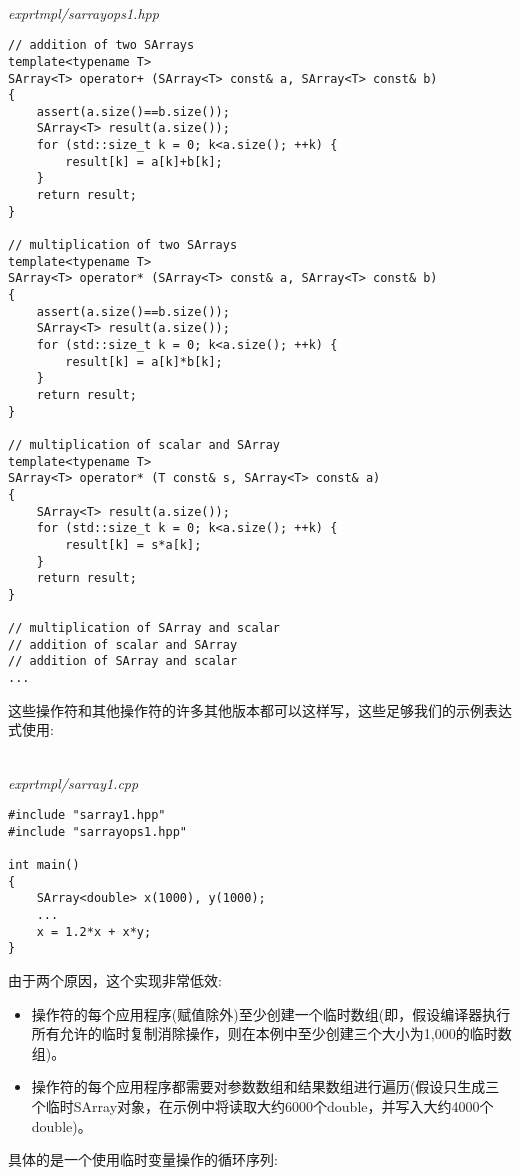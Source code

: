 \hspace*{\fill} \\ %
\noindent
\textit{exprtmpl/sarrayops1.hpp}
\begin{lstlisting}[style=styleCXX]
// addition of two SArrays
template<typename T>
SArray<T> operator+ (SArray<T> const& a, SArray<T> const& b)
{
	assert(a.size()==b.size());
	SArray<T> result(a.size());
	for (std::size_t k = 0; k<a.size(); ++k) {
		result[k] = a[k]+b[k];
	}
	return result;
}

// multiplication of two SArrays
template<typename T>
SArray<T> operator* (SArray<T> const& a, SArray<T> const& b)
{
	assert(a.size()==b.size());
	SArray<T> result(a.size());
	for (std::size_t k = 0; k<a.size(); ++k) {
		result[k] = a[k]*b[k];
	}
	return result;
}

// multiplication of scalar and SArray
template<typename T>
SArray<T> operator* (T const& s, SArray<T> const& a)
{
	SArray<T> result(a.size());
	for (std::size_t k = 0; k<a.size(); ++k) {
		result[k] = s*a[k];
	}
	return result;
}

// multiplication of SArray and scalar
// addition of scalar and SArray
// addition of SArray and scalar
...
\end{lstlisting}

这些操作符和其他操作符的许多其他版本都可以这样写，这些足够我们的示例表达式使用:

\hspace*{\fill} \\ %
\noindent
\textit{exprtmpl/sarray1.cpp}
\begin{lstlisting}[style=styleCXX]
#include "sarray1.hpp"
#include "sarrayops1.hpp"

int main()
{
	SArray<double> x(1000), y(1000);
	...
	x = 1.2*x + x*y;
}
\end{lstlisting}

由于两个原因，这个实现非常低效:

\begin{itemize}
\item 
操作符的每个应用程序(赋值除外)至少创建一个临时数组(即，假设编译器执行所有允许的临时复制消除操作，则在本例中至少创建三个大小为1,000的临时数组)。

\item 
操作符的每个应用程序都需要对参数数组和结果数组进行遍历(假设只生成三个临时SArray对象，在示例中将读取大约6000个double，并写入大约4000个double)。
\end{itemize}

具体的是一个使用临时变量操作的循环序列:


